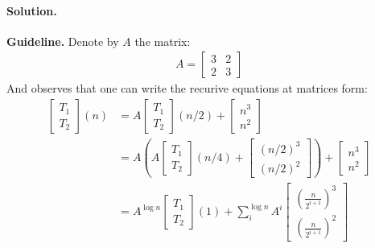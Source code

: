   \paragraph{Solution.} \textbf{Guideline.} Denote by $A$ the matrix:  
 \begin{equation*}
   \begin{split}
     A = \begin{bmatrix}
        3 & 2 \\
        2 & 3 
\end{bmatrix}
   \end{split}
 \end{equation*}
 And observes that one can write the recurive equations at matrices form:
 \begin{equation*}
   \begin{split}
     \begin{bmatrix}
       T_{1} \\
       T_{2} 
     \end{bmatrix} (n) & = A \begin{bmatrix}
       T_{1} \\
       T_{2} 
     \end{bmatrix} (n/2)  + \begin{bmatrix}
       n^{3} \\
       n^{2}
     \end{bmatrix} \\ 
& = A \left( A  \begin{bmatrix}
       T_{1} \\
       T_{2} 
     \end{bmatrix} (n/4)  + \begin{bmatrix}
       \left(n/2\right)^{3} \\
       \left(n/2\right)^{2}
   \end{bmatrix} \right) + \begin{bmatrix}
       n^{3} \\
       n^{2}
     \end{bmatrix} \\
     & = A^{\log n} \begin{bmatrix}
       T_{1} \\
       T_{2} 
     \end{bmatrix}(1) +\sum_{i}^{\log n}{ A^{i} \begin{bmatrix}
         \left(\frac{n}{2^{i+1}}\right)^{3} \\
         \left(\frac{n}{2^{i+1}}\right)^{2} 
   \end{bmatrix}} \\ 

\end{split}
\end{equation*}
